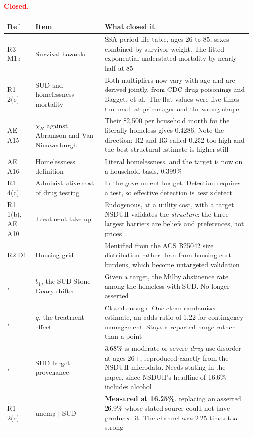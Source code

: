 \documentclass[11pt]{article}
\newcommand{\nw}[1]{\textcolor{red}{#1}}
\begin{document}
\nw{\paragraph{Closed.}}

{\color{red}\begin{longtable}{lL{5.0cm}L{6.4cm}}
\toprule
Ref & Item & What closed it\\
\midrule
\endhead
R3 M1b & Survival hazards & SSA period life table, ages 26 to 85, sexes combined by survivor weight. The fitted exponential understated mortality by nearly half at 85\\
R1 2(c) & SUD and homelessness mortality & Both multipliers now vary with age and are derived jointly, from CDC drug poisonings and Baggett et al.\ The flat values were five times too small at prime ages and the wrong shape\\
AE A15 & $\chi_H$ against Abramson and Van Nieuwerburgh & Their \$2{,}500 per household month for the literally homeless gives 0.4286. Note the direction: R2 and R3 called 0.252 too high and the best structural estimate is higher still\\
AE A16 & Homelessness definition & Literal homelessness, and the target is now on a household basis, 0.399\%\\
R1 4(c) & Administrative cost of drug testing & In the government budget. Detection requires a test, so effective detection is $\text{test}\times\text{detect}$\\
R1 1(b), AE A10 & Treatment take up & Endogenous, at a utility cost, with a target. NSDUH validates the \emph{structure}: the three largest barriers are beliefs and preferences, not prices\\
R2 D1 & Housing grid & Identified from the ACS B25042 size distribution rather than from housing cost burdens, which become untargeted validation\\
, & $b_1$, the SUD Stone--Geary shifter & Given a target, the Milby abstinence rate among the homeless with SUD. No longer asserted\\
, & $g$, the treatment effect & Closed enough. One clean randomised estimate, an odds ratio of 1.22 for contingency management. Stays a reported range rather than a point\\
, & SUD target provenance & 3.68\% is moderate or severe \emph{drug} use disorder at ages 26+, reproduced exactly from the NSDUH microdata. Needs stating in the paper, since NSDUH's headline of 16.6\% includes alcohol\\
R1 2(c) & unemp $\mid$ SUD & \textbf{Measured at 16.25\%}, replacing an asserted 26.9\% whose stated source could not have produced it. The channel was 2.25 times too strong\\
\bottomrule
\end{longtable}}
\end{document}
